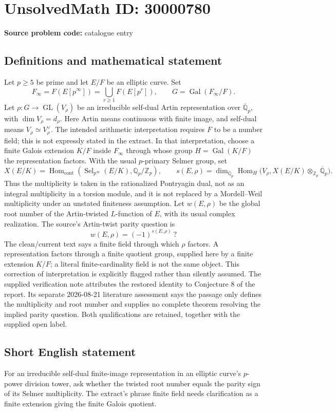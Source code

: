 \documentclass[11pt]{article}
\newcommand{\Z}{\mathbb{Z}}
\newcommand{\Q}{\mathbb{Q}}
\begin{document}
\section*{UnsolvedMath ID: 30000780}
\textbf{Source problem code:} catalogue entry
\subsection{Definitions and mathematical statement}
Let $p\geq5$ be prime and let $E/F$ be an elliptic curve. Set \[F_\infty=F(E[p^\infty])=\bigcup_{r\geq1}F(E[p^r]),\qquad G=\operatorname{Gal}(F_\infty/F).\] Let $\rho:G\to\operatorname{GL}(V_\rho)$ be an irreducible self-dual Artin representation over $\overline{\Q}_p$, with $\dim V_\rho=d_\rho$. Here Artin means continuous with finite image, and self-dual means $V_\rho\simeq V_\rho^\vee$. The intended arithmetic interpretation requires $F$ to be a number field; this is not expressly stated in the extract. In that interpretation, choose a finite Galois extension $K/F$ inside $F_\infty$ through whose group $H=\operatorname{Gal}(K/F)$ the representation factors. With the usual $p$-primary Selmer group, set \[X(E/K)=\operatorname{Hom}_{\mathrm{cont}}(\operatorname{Sel}_{p^\infty}(E/K),\Q_p/\Z_p),\qquad s(E,\rho)=\dim_{\overline{\Q}_p}\operatorname{Hom}_H\bigl(V_\rho,X(E/K)\otimes_{\Z_p}\overline{\Q}_p\bigr).\] Thus the multiplicity is taken in the rationalized Pontryagin dual, not as an integral multiplicity in a torsion module, and it is not replaced by a Mordell--Weil multiplicity under an unstated finiteness assumption. Let $w(E,\rho)$ be the global root number of the Artin-twisted $L$-function of $E$, with its usual complex realization. The source's Artin-twist parity question is \[w(E,\rho)=(-1)^{s(E,\rho)}\ ?\] The clean/current text says a finite field through which $\rho$ factors. A representation factors through a finite quotient group, supplied here by a finite extension $K/F$; a literal finite-cardinality field is not the same object. This correction of interpretation is explicitly flagged rather than silently assumed. The supplied verification note attributes the restored identity to Conjecture 8 of the report. Its separate 2026-08-21 literature assessment says the passage only defines the multiplicity and root number and supplies no complete theorem resolving the implied parity question. Both qualifications are retained, together with the supplied open label.
\subsection{Short English statement}
For an irreducible self-dual finite-image representation in an elliptic curve's $p$-power division tower, ask whether the twisted root number equals the parity sign of its Selmer multiplicity. The extract's phrase finite field needs clarification as a finite extension giving the finite Galois quotient.
\end{document}
